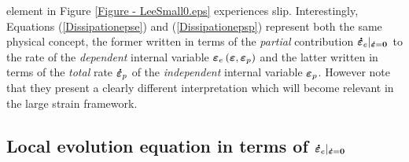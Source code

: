 \documentclass[preprint,review,12pt,sort&compress]{elsarticle}%
\newcommand{\epsdo}[0]{\scriptsize\mathbf{\dot \varepsilon} = \mathbf{0}\normalsize\mathbf{}}
\renewcommand{\mathbf}[1]{\mbox{\boldmath $#1$ \unboldmath}  \!\!}
\begin{document}
element in Figure \ref{Figure - LeeSmall0.eps} experiences slip.
Interestingly, Equations (\ref{Dissipationepse}) and (\ref{Dissipationepsp})
represent both the same physical concept, the former written in terms of the
\emph{partial} contribution $\mathbf{\dot{\varepsilon}}_{e}|_{%
\epsdo
}$ to the rate of the \emph{dependent} internal variable $\mathbf{\varepsilon
}_{e}\left(  \mathbf{\varepsilon},\mathbf{\varepsilon}_{p}\right)  $ and the
latter written in terms of the \emph{total} rate $\mathbf{\dot{\varepsilon}%
}_{p}$ of the \emph{independent} internal variable $\mathbf{\varepsilon}_{p}$.
However note that they present a clearly different interpretation which will
become relevant in the large strain framework.

\subsection{Local evolution equation in terms of $\mathbf{\dot{\varepsilon}%
}_{e}|_{%
\epsdo
}$}
\end{document}

